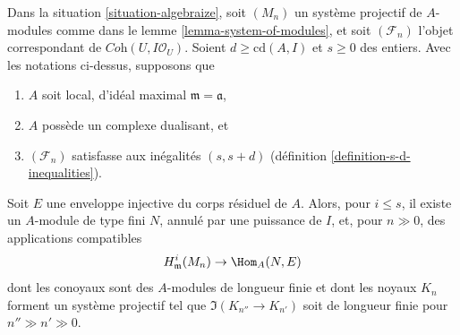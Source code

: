 \begin{lemma}
\label{lemma-helper-algebraize}
Dans la situation \ref{situation-algebraize}, soit $(M_n)$ un système projectif de
$A$-modules comme dans le lemme \ref{lemma-system-of-modules}, et soit
$(\mathcal{F}_n)$ l'objet correspondant de
$\textit{Coh}(U, I\mathcal{O}_U)$. Soient $d \geq \text{cd}(A, I)$
et $s \geq 0$ des entiers.
Avec les notations ci-dessus, supposons que
\begin{enumerate}
\item $A$ soit local, d'idéal maximal $\mathfrak m = \mathfrak a$,
\item $A$ possède un complexe dualisant, et
\item $(\mathcal{F}_n)$ satisfasse aux inégalités $(s, s + d)$
(définition \ref{definition-s-d-inequalities}).
\end{enumerate}
Soit $E$ une enveloppe injective du corps résiduel de $A$. Alors, pour $i \leq s$,
il existe un $A$-module de type fini $N$, annulé par une puissance
de $I$, et, pour $n \gg 0$, des applications compatibles
$$
H^i_\mathfrak m(M_n) \to \Hom_A(N, E)
$$
dont les conoyaux sont des $A$-modules de longueur finie et dont les noyaux $K_n$
forment un système projectif tel que $\Im(K_{n''} \to K_{n'})$ soit de longueur
finie pour $n'' \gg n' \gg 0$.
\end{lemma}

